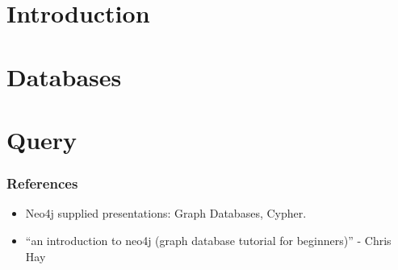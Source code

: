 \section[Intro]{Introduction}



\section[Db]{Databases}



\section[Query]{Query}



\begin{frame}\frametitle{References}
\begin{itemize}
\item Neo4j supplied presentations: Graph Databases, Cypher.
\item ``an introduction to neo4j (graph database tutorial for beginners)'' - Chris Hay
\end{itemize}
\end{frame}